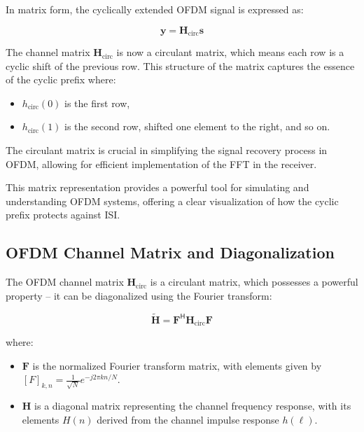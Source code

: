 In matrix form, the cyclically extended OFDM signal is expressed as:

\begin{equation}
    \mathbf{y} = \mathbf{H}_{\text{circ}} \mathbf{s}
\end{equation}

The channel matrix \(\mathbf{H}_{\text{circ}}\) is now a circulant matrix, which means each row is a cyclic shift of the previous row. This structure of the matrix captures the essence of the cyclic prefix where:

\begin{itemize}
    \item \(h_{\text{circ}}(0)\) is the first row, 
    \item \(h_{\text{circ}}(1)\) is the second row, shifted one element to the right, and so on.
\end{itemize}

The circulant matrix is crucial in simplifying the signal recovery process in OFDM, allowing for efficient implementation of the FFT in the receiver.

This matrix representation provides a powerful tool for simulating and understanding OFDM systems, offering a clear visualization of how the cyclic prefix protects against ISI.

\subsection*{OFDM Channel Matrix and Diagonalization}

The OFDM channel matrix \(\mathbf{H}_{\text{circ}}\) is a circulant matrix, which possesses a powerful property – it can be diagonalized using the Fourier transform:

\begin{equation}
    \mathbf{\tilde{H}} = \mathbf{F}^\mathsf{H} \mathbf{H}_{\text{circ}} \mathbf{F}
\end{equation}

where:
\begin{itemize}
    \item \(\mathbf{F}\) is the normalized Fourier transform matrix, with elements given by \([F]_{k,n} = \frac{1}{\sqrt{N}} e^{-j2\pi kn / N}\).
    \item \(\mathbf{H}\) is a diagonal matrix representing the channel frequency response, with its elements \(H(n)\) derived from the channel impulse response \(h(\ell)\).
\end{itemize}

